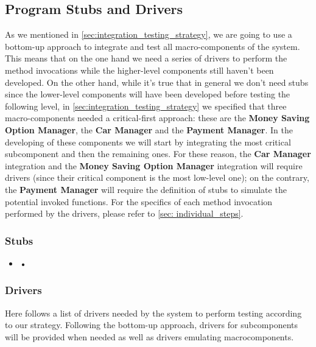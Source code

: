 	\subsection{Program Stubs and Drivers}
	
	As we mentioned in \autoref{sec:integration_testing_strategy}, we are going to use a bottom-up approach to integrate and test all macro-components of the system. This means that on the one hand we need a series of drivers to perform the method invocations while the higher-level components still haven't been developed. On the other hand, while it's true that in general we don't need stubs since the lower-level components will have been developed before testing the following level, in \autoref{sec:integration_testing_strategy} we specified that three macro-components needed a critical-first approach: these are the \textbf{Money Saving Option Manager}, the \textbf{Car Manager} and the \textbf{Payment Manager}. In the developing of these components we will start by integrating the most critical subcomponent and then the remaining ones. For these reason, the \textbf{Car Manager} integration and the \textbf{Money Saving Option Manager} integration will require drivers (since their critical component is the most low-level one); on the contrary, the \textbf{Payment Manager} will require the definition of stubs to simulate the potential invoked functions.
	For the specifics of each method invocation performed by the drivers, please refer to \autoref{sec: individual_steps}.
		
		\subsubsection{Stubs}
		\label{sec:stubs}
				
			\begin{itemize}
				\item \textbf{•} %
			\end{itemize}
		
		
		\subsubsection{Drivers}
		\label{sec:drivers}

		Here follows a list of drivers needed by the system to perform testing according to our strategy. Following the bottom-up approach, drivers for subcomponents will be provided when needed as well as drivers emulating macrocomponents.
		
